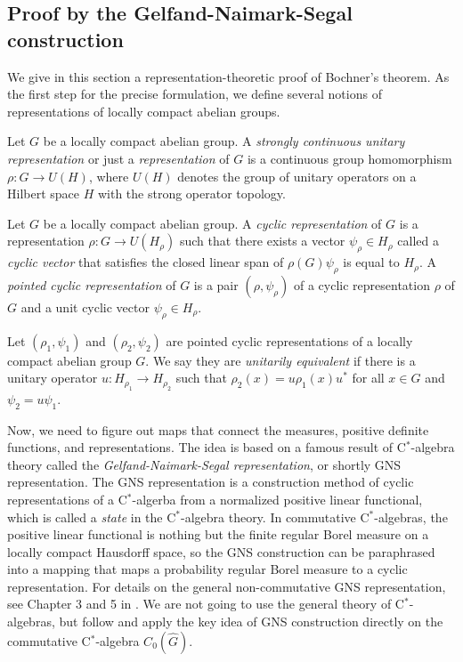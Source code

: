 \documentclass[a4paper]{article}
\begin{document}
\subsection{Proof by the Gelfand-Naimark-Segal construction}

We give in this section a representation-theoretic proof of Bochner's theorem.
As the first step for the precise formulation, we define several notions of representations of locally compact abelian groups.

\begin{defn}
Let $G$ be a locally compact abelian group.
A \emph{strongly continuous unitary representation} or just a \emph{representation} of $G$ is a continuous group homomorphism $\rho:G\to U(H)$, where $U(H)$ denotes the group of unitary operators on a Hilbert space $H$ with the strong operator topology.
\end{defn}

\begin{defn}
Let $G$ be a locally compact abelian group.
A \emph{cyclic representation} of $G$ is a representation $\rho:G\to U(H_\rho)$ such that there exists a vector $\psi_\rho\in H_\rho$ called a \emph{cyclic vector} that satisfies the closed linear span of $\rho(G)\psi_\rho$ is equal to $H_\rho$.
A \emph{pointed cyclic representation} of $G$ is a pair $(\rho,\psi_\rho)$ of a cyclic representation $\rho$ of $G$ and a unit cyclic vector $\psi_\rho\in H_\rho$.
\end{defn}

\begin{defn}
Let $(\rho_1,\psi_1)$ and $(\rho_2,\psi_2)$ are pointed cyclic representations of a locally compact abelian group $G$.
We say they are \emph{unitarily equivalent} if there is a unitary operator $u:H_{\rho_1}\to H_{\rho_2}$ such that $\rho_2(x)=u\rho_1(x)u^*$ for all $x\in G$ and $\psi_2=u\psi_1$.
\end{defn}

Now, we need to figure out maps that connect the measures, positive definite functions, and representations.
The idea is based on a famous result of C$^*$-algebra theory called the \emph{Gelfand-Naimark-Segal representation}, or shortly GNS representation.
The GNS representation is a construction method of cyclic representations of a C$^*$-algerba from a normalized positive linear functional, which is called a \emph{state} in the C$^*$-algebra theory.
In commutative C$^*$-algebras, the positive linear functional is nothing but the finite regular Borel measure on a locally compact Hausdorff space, so the GNS construction can be paraphrased into a mapping that maps a probability regular Borel measure to a cyclic representation.
For details on the general non-commutative GNS representation, see Chapter 3 and 5 in \cite{murphy2014c}.
We are not going to use the general theory of C$^*$-algebras, but follow and apply the key idea of GNS construction directly on the commutative C$^*$-algebra $C_0(\hat G)$.
\end{document}
